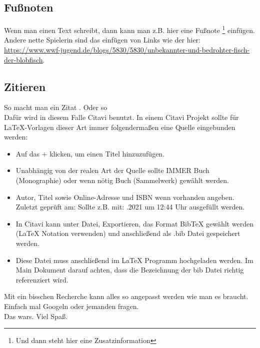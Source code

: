\subsection{Fußnoten}
\label{subsec_Fußnoten}
Wenn man einen Text schreibt, dann kann man z.B. hier eine Fußnote \footnote{Und dann steht hier eine Zusatzinformation} einfügen. Andere nette Spielerin sind das einfügen von Links wie der hier: \url{https://www.wwf-jugend.de/blogs/5830/5830/unbekannter-und-bedrohter-fisch-der-blobfisch}.


\subsection{Zitieren}
\label{subsec_Zitieren}

So macht man ein Zitat \cite{Follinger.2016}. Oder so \cite{ifmelectronic.2004}\\
Dafür wird in diesem Falle Citavi benutzt. In einem Citavi Projekt sollte für LaTeX-Vorlagen dieser Art immer folgendermaßen eine Quelle eingebunden werden:
\begin{itemize}
    \item Auf das $+$ klicken, um einen Titel hinzuzufügen.
    \item Unabhängig von der realen Art der Quelle sollte IMMER \glqq Buch (Monographie)\grqq{} oder wenn nötig \glqq Buch (Sammelwerk)\grqq{} gewählt werden.
    \item Autor, Titel sowie Online-Adresse und ISBN wenn vorhanden angeben. Zuletzt geprüft am: Sollte z.B. mit: .2021 um 12:44 Uhr\grqq{} ausgefüllt werden.
    \item In Citavi kann unter Datei, Exportieren, das Format \glqq BibTeX\grqq{} gewählt werden (LaTeX Notation verwenden) und anschließend als .bib Datei gespeichert werden.
    \item Diese Datei muss anschließend im LaTeX Programm hochgeladen werden. Im Main Dokument darauf achten, dass die Bezeichnung der bib Datei richtig referenziert wird.
\end{itemize}
Mit ein bisschen Recherche kann alles so angepasst werden wie man es braucht. Einfach mal Googeln oder jemanden fragen.\\
Das wars. Viel Spaß.

\cleardoublepage %
